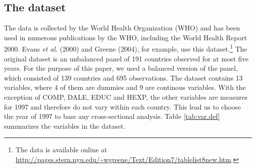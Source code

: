\documentclass[12pt,a4paper]{article}\usepackage[]{graphicx}\usepackage[]{color}
\begin{document}
\subsection{The dataset}
The data is collected by the World Health Organization (WHO) and has been used in numerous publications by the WHO, including the World Health Report 2000. Evans \textit{et al.} (2000) and Greene (2004), for example, use this dataset.\footnote{The data is available online at \\ \url{http://pages.stern.nyu.edu/~wgreene/Text/Edition7/tablelist8new.htm}.} The original dataset is an unbalanced panel of 191 countries observed for at most five years. For the purpose of this paper, we used a balanced version of the panel, which consisted of 139 countries and 695 observations. The dataset contains 13 variables, where 4 of them are dummies and 9 are continous variables. With the exception of COMP, DALE, EDUC and HEXP, the other variables are measures for 1997 and therefore do not vary within each country. This lead us to choose the year of 1997 to base any cross-sectional analysis. Table \ref{tab:var.def} summarizes the variables in the dataset.
\end{document}
